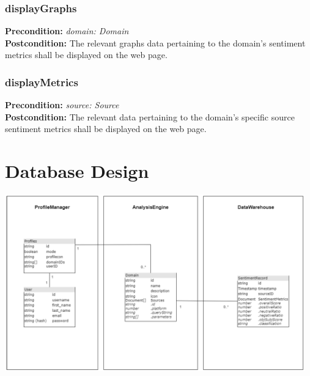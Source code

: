\documentclass[12pt]{article}
\begin{document}
\subsubsection*{displayGraphs}
\textbf{Precondition:} \textit{domain: Domain} \\
\textbf{Postcondition:} The relevant graphs data pertaining to the domain's sentiment metrics shall be displayed on the web page.

\subsubsection*{displayMetrics}
\textbf{Precondition:} \textit{source: Source} \\
\textbf{Postcondition:} The relevant data pertaining to the domain's specific source sentiment metrics shall be displayed on the web page.



\newpage

\section{Database Design}

\includegraphics[width=13cm]{../../Images/databaseDesignPic.png}\\\\

\newpage
\end{document}
